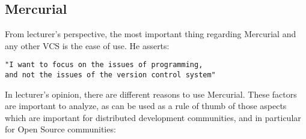 \documentclass[11pt]{article}
\begin{document}
\subsection{Mercurial}
From lecturer's perspective, the most important thing regarding Mercurial and any other VCS is the ease of use. He asserts:

\begin{verbatim}
"I want to focus on the issues of programming, 
and not the issues of the version control system"
\end{verbatim}

In lecturer's opinion, there are different reasons to use Mercurial. These factors are important to analyze, as can be used as a rule of thumb of those aspects which are important for distributed development communities, and in particular for Open Source communities:
\end{document}
